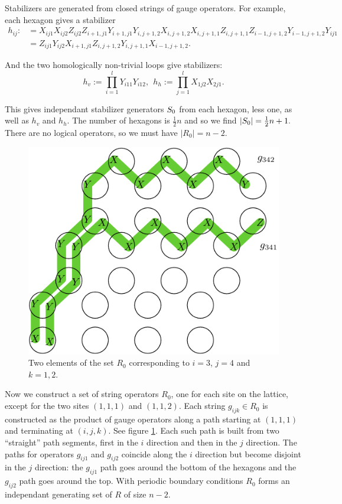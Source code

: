 \documentclass[12pt]{article}
\begin{document}
Stabilizers are generated from closed strings of
gauge operators. 
For example, each hexagon gives a stabilizer
\begin{align*}
h_{ij}:&= 
X_{ij1}X_{ij2}
Z_{ij2}Z_{i+1,j1}
Y_{i+1,j1}Y_{i,j+1,2}
X_{i,j+1,2}X_{i,j+1,1}
Z_{i,j+1,1}Z_{i-1,j+1,2}
Y_{i-1,j+1,2}Y_{ij1}
\\
&= 
Z_{ij1} Y_{ij2} X_{i+1,j1}
Z_{i,j+1,2} Y_{i,j+1,1} X_{i-1,j+1,2}.
\end{align*}

And the two homologically non-trivial loops
give stabilizers:
$$
h_v := \prod_{i=1}^l Y_{i11} Y_{i12},\ \ 
h_h := \prod_{j=1}^l X_{1j2} X_{2j1}.
$$

This gives independant stabilizer generators $S_0$
from each hexagon, less one, as well as $h_v$ and $h_h.$
The number of hexagons is $\frac{1}{2}n$ and
so we find $|S_0|=\frac{1}{2} n+1.$
There are no logical operators, so we
must have $|R_0|=n-2.$

\begin{figure}[th!]
\begin{center}
        \includegraphics[width=0.5\columnwidth]{fig_01.pdf}
\caption{Two elements of the set $R_0$ corresponding
to $i=3$, $j=4$ and $k=1,2.$}
\label{jaws}
\end{center}
\end{figure}

Now we construct a set of string operators $R_0$,
one for each site on the lattice, except for
the two sites $(1,1,1)$ and $(1,1,2).$
Each string $g_{ijk}\in R_0$
is constructed as the product of
gauge operators along a path starting at
$(1,1,1)$ and terminating at $(i,j,k).$
See figure \ref{jaws}.
Each such path is built from two ``straight''
path segments, first in the $i$ direction
and then in the $j$ direction. 
The paths for operators $g_{ij1}$ and
$g_{ij2}$ coincide along the $i$ direction
but become disjoint in the $j$ direction:
the $g_{ij1}$ path goes around the bottom
of the hexagons and the $g_{ij2}$ path
goes around the top.
With periodic boundary conditions $R_0$ forms an
independant generating set of $R$ of size $n-2.$
\end{document}
